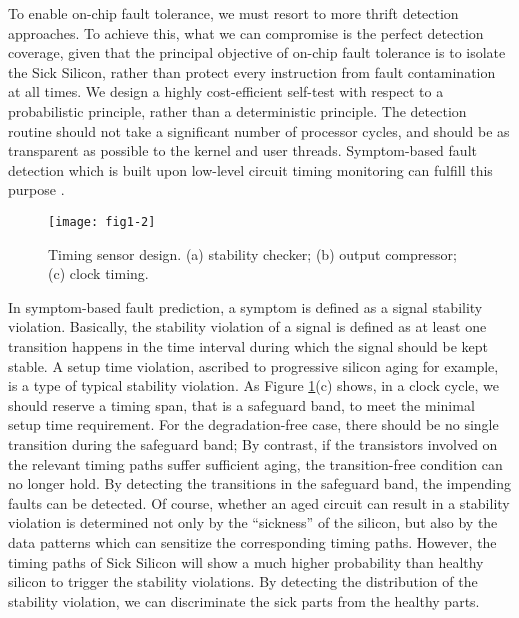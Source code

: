 To enable on-chip fault tolerance, we must resort to more thrift detection approaches. To achieve this, what we can compromise is the perfect detection coverage, given that the principal objective of on-chip fault tolerance is to isolate the Sick Silicon, rather than protect every instruction from fault contamination at all times. We design a highly cost-efficient self-test with respect to a probabilistic principle, rather than a deterministic principle. The detection routine should not take a significant number of processor cycles, and should be as transparent as possible to the kernel and user threads. Symptom-based fault detection which is built upon low-level circuit timing monitoring can fulfill this purpose \cite{yan2010svfd, wang2006restore}. 

\begin{figure}[t]
\centering
\texttt{[image: fig1-2]}
\caption{Timing sensor design. (a) stability checker; (b) output compressor; (c) clock timing.}
\label{fig:timing-sensor} 
\end{figure}


In symptom-based fault prediction, a symptom is defined as a signal stability violation. Basically, the stability violation of a signal is defined as at least one transition happens in the time interval during which the signal should be kept stable. A setup time violation, ascribed to progressive silicon aging for example, is a type of typical stability violation. As Figure \ref{fig:timing-sensor}(c) shows, in a clock cycle, we should reserve a timing span, that is a safeguard band, to meet the minimal setup time requirement. For the degradation-free case, there should be no single transition during the safeguard band; By contrast, if the transistors involved on the relevant timing paths suffer sufficient aging, the transition-free condition can no longer hold. By detecting the transitions in the safeguard band, the impending faults can be detected. Of course, whether an aged circuit can result in a stability violation is determined not only by the “sickness” of the silicon, but also by the data patterns which can sensitize the corresponding timing paths. However, the timing paths of Sick Silicon will show a much higher probability than healthy silicon to trigger the stability violations. By detecting the distribution of the stability violation, we can discriminate the sick parts from the healthy parts. 

